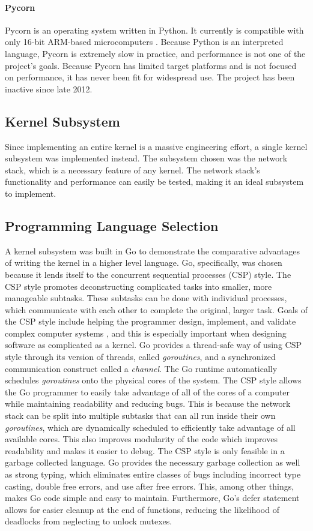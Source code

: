 \documentclass[twocolumn,10pt]{article}
\begin{document}
\paragraph{Pycorn}
Pycorn is an operating system written in Python. It currently is compatible with only 16-bit ARM-based microcomputers \cite{Pycorn}. Because Python is an interpreted language, Pycorn is extremely slow in practice, and performance is not one of the project's goals. Because Pycorn has limited target platforms and is not focused on performance, it has never been fit for widespread use. The project has been inactive since late 2012.

\subsection{Kernel Subsystem}
Since implementing an entire kernel is a massive engineering effort, a single kernel subsystem was implemented instead. 
The subsystem chosen was the network stack, which is a necessary feature of any kernel. The network stack's functionality and performance can easily be tested, making it an ideal subsystem to implement.

\subsection{Programming Language Selection}
A kernel subsystem was built in Go to demonstrate the comparative advantages of writing the kernel in a higher level language. Go, specifically, was chosen because it lends itself to the concurrent sequential processes (CSP) style. The CSP style promotes deconstructing complicated tasks into smaller, more manageable subtasks. These subtasks can be done with individual processes, which communicate with each other to complete the original, larger task. Goals of the CSP style include helping the programmer design, implement, and validate complex computer systems \cite{CSPbook}, and this is especially important when designing software as complicated as a kernel. 
Go provides a thread-safe way of using CSP style through its version of threads, called \textit{goroutines}, and a synchronized communication construct called a \textit{channel}. The Go runtime automatically schedules \textit{goroutines} onto the physical cores of the system.
The CSP style allows the Go programmer to easily take advantage of all of the cores of a computer while maintaining readability and reducing bugs. This is because the network stack can be split into multiple subtasks that can all run inside their own \textit{goroutines}, which are dynamically scheduled to efficiently take advantage of all available cores. This also improves modularity of the code which improves readability and makes it easier to debug.
The CSP style is only feasible in a garbage collected language. Go provides the necessary garbage collection as well as strong typing, which eliminates entire classes of bugs including incorrect type casting, double free errors, and use after free errors. This, among other things, makes Go code simple and easy to maintain. Furthermore, Go's defer statement allows for easier cleanup at the end of functions, reducing the likelihood of deadlocks from neglecting to unlock mutexes. 
\end{document}

